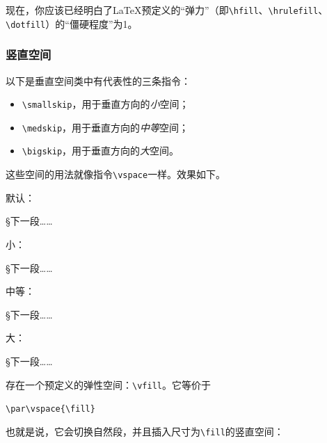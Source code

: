 现在，你应该已经明白了\LaTeX 预定义的``弹力''（即\verb|\hfill|、\verb|\hrulefill|、\verb|\dotfill|）的``僵硬程度''为1。

\subsubsection{竖直空间}

以下是垂直空间类中有代表性的三条指令：

\begin{itemize}
  \item \verb|\smallskip|，用于垂直方向的\emph{小}空间；
  \item \verb|\medskip|，用于垂直方向的\emph{中等}空间；
  \item \verb|\bigskip|，用于垂直方向的\emph{大}空间。
\end{itemize}

这些空间的用法就像指令\verb|\vspace|一样。效果如下。

\begin{center}
  \begin{minipage}[t]{0.2\textwidth}
  默认：
  \par
  \S 下一段……
  \end{minipage}
  \begin{minipage}[t]{0.2\textwidth}
  小：
  \par\smallskip
  \S 下一段……
  \end{minipage}
  \begin{minipage}[t]{0.2\textwidth}
  中等：
  \par\medskip
  \S 下一段……
  \end{minipage}
  \begin{minipage}[t]{0.2\textwidth}
  大：
  \par\bigskip
  \S 下一段……
  \end{minipage}
  \end{center}

存在一个预定义的弹性空间：\verb|\vfill|。它等价于

\begin{dmd}
\verb|\par\vspace{\fill}|
\end{dmd}

也就是说，它会切换自然段，并且插入尺寸为\verb|\fill|的竖直空间：

